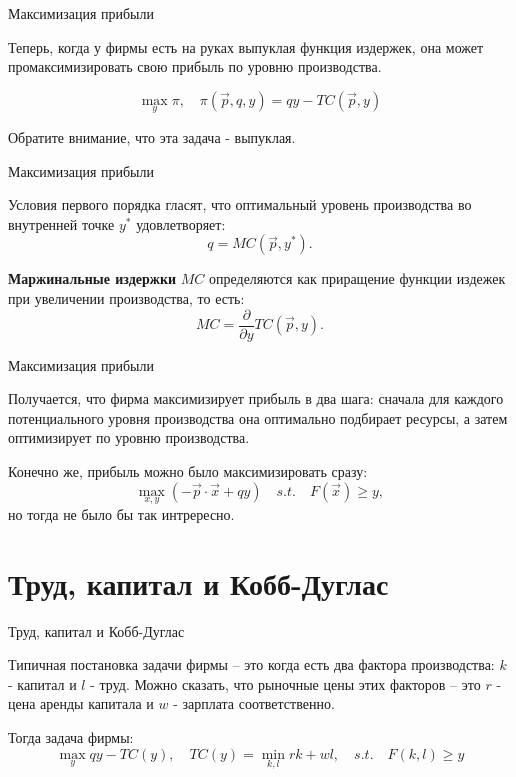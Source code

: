 \documentclass{beamer}
\begin{document}
\begin{frame}{Максимизация прибыли}

Теперь, когда у фирмы есть на руках выпуклая функция издержек, она может промаксимизировать свою прибыль по уровню производства.

$$ \max_{y} \pi, \quad \pi(\vec p, q, y) = q y - TC(\vec p, y)$$

Обратите внимание, что эта задача - выпуклая.

\end{frame}

\begin{frame}{Максимизация прибыли}

Условия первого порядка гласят, что оптимальный уровень производства во внутренней точке $y^{\ast}$ удовлетворяет:
$$ q = MC(\vec p, y^{\ast}).$$

\begin{definition}
\textbf{Маржинальные издержки} $MC$ определяются как приращение функции издежек при увеличении производства, то есть: 
$$ MC = \frac{\partial}{\partial y} TC(\vec p, y).$$
\end{definition}

\end{frame}

\begin{frame}{Максимизация прибыли}

Получается, что фирма максимизирует прибыль в два шага: сначала для каждого потенциального уровня производства она оптимально подбирает ресурсы, а затем оптимизирует по уровню производства. 

Конечно же, прибыль можно было максимизировать сразу:
$$ \max_{x,y} (- \vec p \cdot \vec x + q y) \quad s.t. \quad F(\vec x)  \geqslant y,$$
но тогда не было бы так интрересно.

\end{frame}

\section{Труд, капитал и Кобб-Дуглас}

\begin{frame}{Труд, капитал и Кобб-Дуглас}

Типичная постановка задачи фирмы – это когда есть два фактора производства: $k$ - капитал и $l$ - труд. Можно сказать, что рыночные цены этих факторов – это $r$ - цена аренды капитала и $w$ - зарплата соответственно. 

Тогда задача фирмы:
$$ \max_y q y - TC(y), \quad TC(y) = \min_{k,l} rk + wl, \quad s.t. \quad F(k,l) \geqslant y$$

\end{frame}
\end{document}
